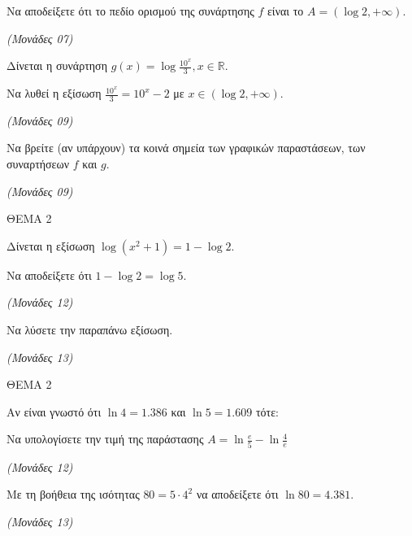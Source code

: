 \documentclass[11pt,a4paper,twoside]{book}
\newcommand{\monades}[1]{\hfill \textit{(Μονάδες #1)}}
\begin{document}
\begin{alist}
\item Να αποδείξετε ότι το πεδίο ορισμού της συνάρτησης $f$ είναι το $A = (\log 2, +\infty)$.

\monades{07}

\item Δίνεται η συνάρτηση $g(x) = \log\frac{10^x}{3}, x \in \mathbb{R}$.

\end{alist}
\begin{alist}
\item
  Να λυθεί η εξίσωση $\frac{10^x}{3} = 10^x - 2$ με $x \in (\log 2, +\infty)$.

\monades{09}


\end{alist}
\begin{alist}
\item
  Να βρείτε (αν υπάρχουν) τα κοινά σημεία των γραφικών παραστάσεων, των συναρτήσεων $f$ και $g$.

\monades{09}
\end{alist}

\vspace{4mm}

ΘΕΜΑ 2

Δίνεται η εξίσωση $\log(x^2 + 1) = 1 - \log 2$.

\begin{alist}
\item Να αποδείξετε ότι $1 - \log 2 = \log 5$.

\monades{12}

\item Να λύσετε την παραπάνω εξίσωση.

\monades{13}
\end{alist}

\vspace{4mm}

ΘΕΜΑ 2

Αν είναι γνωστό ότι $\ln 4 = 1.386$ και $\ln 5 = 1.609$ τότε:

\begin{alist}
\item Να υπολογίσετε την τιμή της παράστασης $A = \ln \frac{e}{5} - \ln \frac{4}{e}$

\monades{12}

\item Με τη βοήθεια της ισότητας $80 = 5 \cdot 4^2$ να αποδείξετε ότι $\ln 80 = 4.381$.

\monades{13}
\end{alist}
\end{document}
